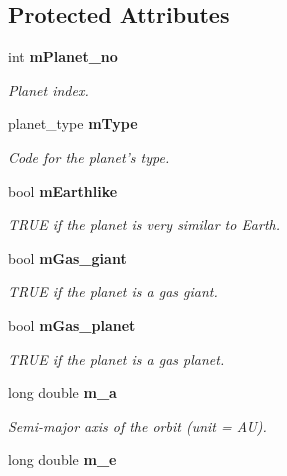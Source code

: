 \subsection*{Protected Attributes}
\begin{CompactItemize}
\item 
int {\bf m\-Planet\_\-no}\label{class_s_g___planet_p0}

\begin{CompactList}\small\item\em Planet index. \item\end{CompactList}\item 
planet\_\-type {\bf m\-Type}\label{class_s_g___planet_p1}

\begin{CompactList}\small\item\em Code for the planet's type. \item\end{CompactList}\item 
bool {\bf m\-Earthlike}\label{class_s_g___planet_p2}

\begin{CompactList}\small\item\em TRUE if the planet is very similar to Earth. \item\end{CompactList}\item 
bool {\bf m\-Gas\_\-giant}\label{class_s_g___planet_p3}

\begin{CompactList}\small\item\em TRUE if the planet is a gas giant. \item\end{CompactList}\item 
bool {\bf m\-Gas\_\-planet}\label{class_s_g___planet_p4}

\begin{CompactList}\small\item\em TRUE if the planet is a gas planet. \item\end{CompactList}\item 
long double {\bf m\_\-a}\label{class_s_g___planet_p5}

\begin{CompactList}\small\item\em Semi-major axis of the orbit (unit = AU). \item\end{CompactList}\item 
long double {\bf m\_\-e}\label{class_s_g___planet_p6}


\end{CompactItemize}
